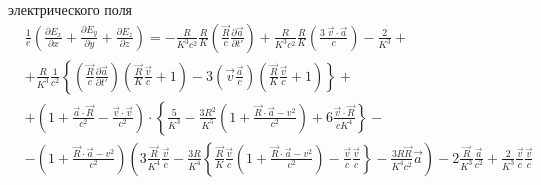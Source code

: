\documentclass[11pt]{article}
\begin{document}
электрического поля \[\begin{align}
  & \frac{1}{e}\left( \frac{\partial {{E}_{x}}}{\partial x}+\frac{\partial {{E}_{y}}}{\partial y}+\frac{\partial {{E}_{z}}}{\partial z} \right)=-\frac{R}{{{K}^{3}}{{c}^{2}}}\frac{R}{K}\left( \frac{\overrightarrow{R}}{c}\frac{\partial \overrightarrow{a}}{\partial t'} \right)+\frac{R}{{{K}^{3}}{{c}^{2}}}\frac{R}{K}\left( \frac{3\ \overrightarrow{v}\cdot \overrightarrow{a}}{c} \right)-\frac{2}{{{K}^{3}}}+ \\ 
 & +\frac{R}{{{K}^{3}}}\frac{1}{{{c}^{2}}}\left\{ \left( \frac{\overrightarrow{R}}{c}\frac{\partial \overrightarrow{a}}{\partial t'} \right)\left( \frac{\overrightarrow{R}}{K}\frac{\overrightarrow{v}}{c}+1 \right)-3\left( \overrightarrow{v}\frac{\overrightarrow{a}}{c} \right)\left( \frac{\overrightarrow{R}}{K}\frac{\overrightarrow{v}}{c}+1 \right) \right\}+ \\ 
 & +\left( 1+\frac{\overrightarrow{a}\cdot \overrightarrow{R}}{{{c}^{2}}}-\frac{\overrightarrow{v}\cdot \overrightarrow{v}}{{{c}^{2}}} \right)\cdot \left\{ \frac{5}{{{K}^{3}}}-\frac{3{{R}^{2}}}{{{K}^{5}}}\left( 1+\frac{\overrightarrow{R}\cdot \overrightarrow{a}-{{v}^{2}}}{{{c}^{2}}} \right)+6\frac{\overrightarrow{v}\cdot \overrightarrow{R}}{c{{K}^{4}}} \right\}- \\ 
 & -\left( 1+\frac{\overrightarrow{R}\cdot \overrightarrow{a}-{{v}^{2}}}{{{c}^{2}}} \right)\left( 3\frac{\overrightarrow{R}}{{{K}^{4}}}\frac{\overrightarrow{v}}{c}-\frac{3R}{{{K}^{4}}}\left\{ \frac{\overrightarrow{R}}{K}\frac{\overrightarrow{v}}{c}\left( 1+\frac{\overrightarrow{R}\cdot \overrightarrow{a}-{{v}^{2}}}{{{c}^{2}}} \right)-\frac{\overrightarrow{v}}{c}\frac{\overrightarrow{v}}{c} \right\}-\frac{3R\overrightarrow{R}}{{{K}^{4}}{{c}^{2}}}\overrightarrow{a} \right)-2\frac{\overrightarrow{R}}{{{K}^{3}}}\frac{\overrightarrow{a}}{{{c}^{2}}}+\frac{2}{{{K}^{3}}}\frac{\overrightarrow{v}}{c}\frac{\overrightarrow{v}}{c} \\
\end{align}\]
\end{document}
